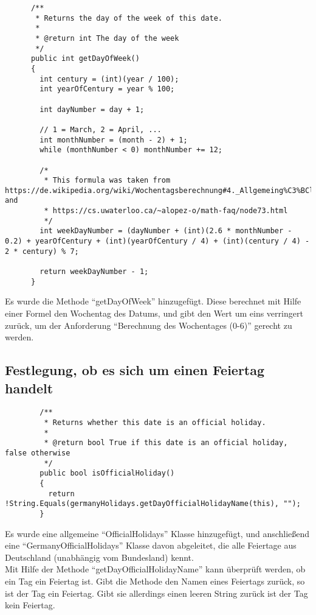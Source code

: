 \documentclass[12pt,pdftex,parskip=half]{scrartcl}
\begin{document}
    \begin{lstlisting}
      /**
       * Returns the day of the week of this date.
       *
       * @return int The day of the week
       */
      public int getDayOfWeek()
      {
        int century = (int)(year / 100);
        int yearOfCentury = year % 100;

        int dayNumber = day + 1;

        // 1 = March, 2 = April, ...
        int monthNumber = (month - 2) + 1;
        while (monthNumber < 0) monthNumber += 12;

        /*
         * This formula was taken from https://de.wikipedia.org/wiki/Wochentagsberechnung#4._Allgemeing%C3%BCltige_Formel and
         * https://cs.uwaterloo.ca/~alopez-o/math-faq/node73.html
         */
        int weekDayNumber = (dayNumber + (int)(2.6 * monthNumber - 0.2) + yearOfCentury + (int)(yearOfCentury / 4) + (int)(century / 4) - 2 * century) % 7;

        return weekDayNumber - 1;
      }
    \end{lstlisting}

    Es wurde die Methode "`getDayOfWeek"' hinzugefügt.
    Diese berechnet mit Hilfe einer Formel den Wochentag des Datums, und gibt den Wert um eins verringert zurück, um der Anforderung "`Berechnung des Wochentages (0-6)"' gerecht zu werden.

    \clearpage


    \subsection{Festlegung, ob es sich um einen Feiertag handelt}

    \begin{lstlisting}
        /**
         * Returns whether this date is an official holiday.
         *
         * @return bool True if this date is an official holiday, false otherwise
         */
        public bool isOfficialHoliday()
        {
          return !String.Equals(germanyHolidays.getDayOfficialHolidayName(this), "");
        }
    \end{lstlisting}

    Es wurde eine allgemeine "`OfficialHolidays"' Klasse hinzugefügt, und anschließend eine "`GermanyOfficialHolidays"' Klasse davon abgeleitet, die alle Feiertage aus Deutschland (unabhängig vom Bundesland) kennt.\\
    Mit Hilfe der Methode "`getDayOfficialHolidayName"' kann überprüft werden, ob ein Tag ein Feiertag ist. Gibt die Methode den Namen eines Feiertags zurück, so ist der Tag ein Feiertag. Gibt sie allerdings einen leeren String zurück ist der Tag kein Feiertag.
\end{document}
